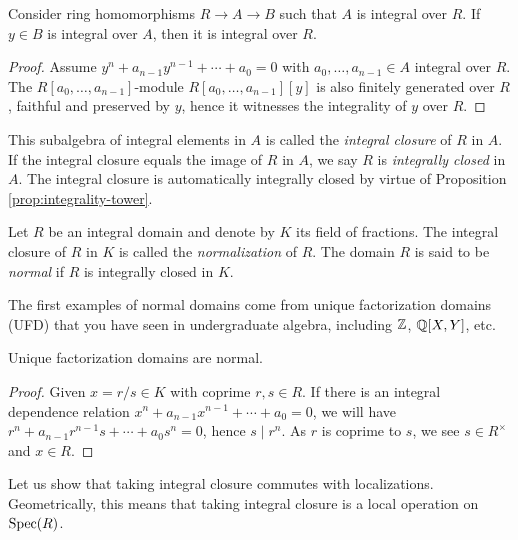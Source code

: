 \begin{proposition}\label{prop:integrality-tower}
	Consider ring homomorphisms $R \to A \to B$ such that $A$ is integral over $R$. If $y \in B$ is integral over $A$, then it is integral over $R$. 
\end{proposition}
\begin{proof}
	Assume $y^n + a_{n-1} y^{n-1} + \cdots + a_0 = 0$ with $a_0, \ldots, a_{n-1} \in A$ integral over $R$. The $R[a_0, \ldots, a_{n-1}]$-module $R[a_0, \ldots, a_{n-1}][y]$ is also finitely generated over $R$, faithful and preserved by $y$, hence it witnesses the integrality of $y$ over $R$.
\end{proof}

This subalgebra of integral elements in $A$ is called the \emph{integral closure} of $R$ in $A$. If the integral closure equals the image of $R$ in $A$, we say $R$ is \emph{integrally closed} in $A$. The integral closure is automatically integrally closed by virtue of Proposition \ref{prop:integrality-tower}.

\begin{definition}
	Let $R$ be an integral domain and denote by $K$ its field of fractions. The integral closure of $R$ in $K$ is called the \emph{normalization} of $R$. The domain $R$ is said to be \emph{normal} if $R$ is integrally closed in $K$.
\end{definition}

The first examples of normal domains come from unique factorization domains (UFD) that you have seen in undergraduate algebra, including $\mathbb{Z}$, $\mathbb{Q}[X,Y]$, etc.

\begin{proposition}
	Unique factorization domains are normal.
\end{proposition}
\begin{proof}
	Given $x = r/s \in K$ with coprime $r,s \in R$. If there is an integral dependence relation $x^n + a_{n-1} x^{n-1} + \cdots + a_0 = 0$, we will have $r^n + a_{n-1} r^{n-1}s + \cdots + a_0 s^n = 0$, hence $s \mid r^n$. As $r$ is coprime to $s$, we see $s \in R^\times$ and $x \in R$.
\end{proof}

Let us show that taking integral closure commutes with localizations. Geometrically, this means that taking integral closure is a local operation on $\operatorname{Spec}(R)$.

